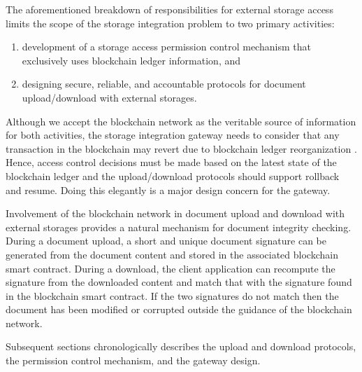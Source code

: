 The aforementioned breakdown of responsibilities for external storage access limits the scope of the storage integration problem to two primary activities: 

\begin{enumerate}
\item development of a storage access permission control mechanism that exclusively uses blockchain ledger information, and
\item designing secure, reliable, and accountable protocols for document upload/download with external storages. 
\end{enumerate}          

Although we accept the blockchain network as the veritable source of information for both activities, the storage integration gateway needs to consider that any transaction in the blockchain may revert due to blockchain ledger reorganization \cite{reorg}. Hence, access control decisions must be made based on the latest state of the blockchain ledger and the upload/download protocols should support rollback and resume. Doing this elegantly is a major design concern for the gateway.

Involvement of the blockchain network in document upload and download with external storages provides a natural mechanism for document integrity checking. During a document upload, a short and unique document signature can be generated from the document content and stored in the associated blockchain smart contract. During a download, the client application can recompute the signature from the downloaded content and match that with the signature found in the blockchain smart contract. If the two signatures do not match then the document has been modified or corrupted outside the guidance of the blockchain network.  

Subsequent sections chronologically describes the upload and download protocols, the permission control mechanism, and the gateway design.

